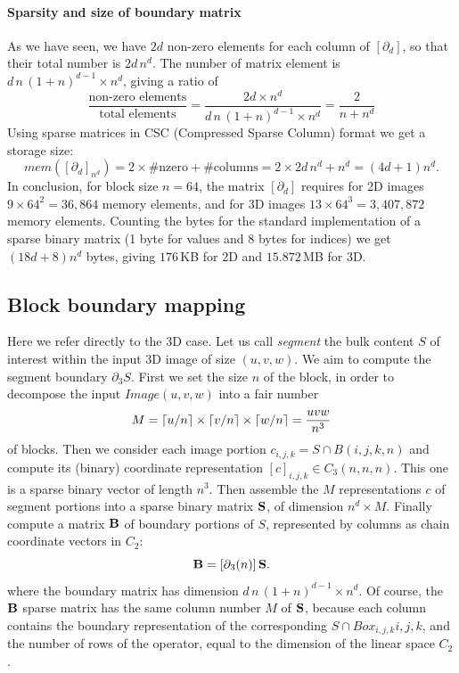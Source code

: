 \paragraph{Sparsity and size of boundary matrix }\label{sec:bbbb} 

As we have seen, we have $2d$ non-zero elements for each column of $[\partial_d]$, so that their total number is $2d\,n^d$. The number of matrix element is $d\,n\,(1+n)^{d-1} \times n^d$, giving a ratio of 
\[
\frac{\mbox{non-zero\ elements}}{\mbox{total\ elements}} = 
\frac{2d\times n^d}{d\,n\,(1+n)^{d-1} \times n^d} =
\frac{2}{n+n^d}
\]
Using sparse matrices in CSC (Compressed Sparse Column) format we get a storage size:
\[
mem([\partial_d]_{n^d}) = 2\times \#\mbox{nzero} + \#\mbox{columns} = 2\times 2d\,n^d + n^d = (4d+1)n^d.
\]
In conclusion, for block size $n=64$, the matrix $[\partial_d]$ requires for 2D images $9\times 64^2=36,864$ memory elements, and for 3D images $13\times 64^3=3,407,872$ memory elements. Counting the bytes for the standard implementation of a sparse binary matrix (1 byte for values and 8 bytes for indices) we get $(18d+8)n^d$ bytes, giving $176$\,KB for 2D and $15.872$\,MB for 3D.

\subsection{Block boundary mapping}\label{sec:bbbb}

Here we refer directly to the 3D case.
Let us call \emph{segment} the bulk content $S$ of interest within the input 3D image of size $(u,v,w)$. We aim to compute the segment boundary $\partial_3 S$. 
First we set the size $n$ of the block, in order to decompose the input $Image(u,v,w)$ into a fair number 
\[
M = \left\lceil u/n \right\rceil \times \left\lceil v/n \right\rceil \times \left\lceil w/n \right\rceil = \frac{uvw}{n^3}
\] of blocks. 
Then we consider each image portion $c_{i,j,k} = S\cap B(i,j,k,n)$ and compute its (binary) coordinate representation  $[c]_{i,j,k}\in C_3(n,n,n)$. This one is a sparse binary vector of length $n^3$. Then assemble the $M$ representations $c$ of segment portions into a sparse binary matrix ${\bf S}$, of dimension $n^d \times M$. Finally compute a matrix ${\bf B}$ of boundary portions of $S$, represented by columns as chain coordinate vectors in $C_2$:
\[
{\bf B} = [\partial_3(n)]\, {\bf S}.
\]
where the boundary matrix has dimension $d\,n\,(1+n)^{d-1} \times n^d$.
Of course, the ${\bf B}$ sparse matrix has the same column number $M$ of ${\bf S}$, because each column contains the boundary representation of the corresponding $S\cap Box_{i,j,k}{i,j,k}$, and the number of rows of the operator, equal to the dimension of the linear space $C_2$.

